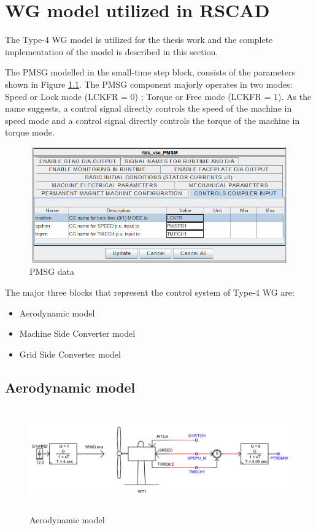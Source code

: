 \chapter{WG model utilized in RSCAD}\label{Appendix_A}

The Type-4 \gls{WG} model is utilized for the thesis work and the complete implementation of the model is described in this section. 

The \gls{PMSG} modelled in the small-time step block, consists of the parameters shown in Figure \ref{fig:PMSG_block_para}. The \gls{PMSG} component majorly operates in two modes: Speed or Lock mode (LCKFR = 0) ; Torque or Free mode (LCKFR = 1).
As the name suggests, a control signal directly controls the speed of the machine in speed mode and a control signal directly controls the torque of the machine in torque mode.  

\begin{figure}[H]
\centering
    \includegraphics[height = 5cm,width = 11.5cm]{Diagrams/Appendix_A/PMSG_block_para.PNG}
    \caption{PMSG data}
    \label{fig:PMSG_block_para}
\end{figure}

The major three blocks that represent the control system of Type-4 \gls{WG} are:
\begin{itemize}
    \item Aerodynamic model
    \item Machine Side Converter model
    \item Grid Side Converter model
\end{itemize}

\section{Aerodynamic model}

\begin{figure}[]
\centering
    \includegraphics[height = 4.5cm,width = 15.5cm]{Diagrams/Appendix_A/Aerodynamic_model.PNG}
    \caption{Aerodynamic model}
    \label{fig:Aerodynamic_model}
\end{figure}

